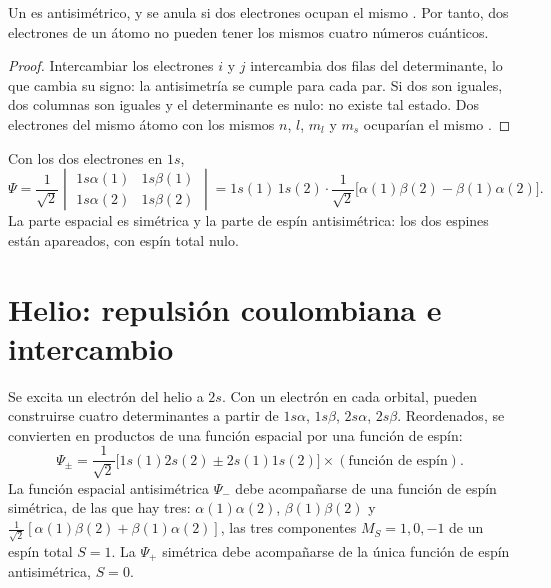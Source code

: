 \begin{theorem}\label{thm:b3:many-electron-atoms:pauli}
Un  es antisimétrico, y se anula si dos electrones
ocupan el mismo . Por tanto, dos electrones de un átomo no pueden tener los
mismos cuatro números cuánticos.
\end{theorem}

\begin{proof}
Intercambiar los electrones $i$ y $j$ intercambia dos filas del determinante,
lo que cambia su signo: la antisimetría se cumple para cada par. Si dos
 son iguales, dos columnas son iguales y el determinante es nulo:
no existe tal estado. Dos electrones del mismo átomo con los mismos $n$, $l$,
$m_l$ y $m_s$ ocuparían el mismo .
\end{proof}

\begin{example}\label{ex:b3:many-electron-atoms:helium-ground}
Con los dos electrones en $1s$,
\[
\Psi = \frac{1}{\sqrt2}\begin{vmatrix}1s\alpha(1) & 1s\beta(1)\\ 1s\alpha(2) &
1s\beta(2)\end{vmatrix} = 1s(1)\,1s(2)\cdot\frac{1}{\sqrt2}\big[\alpha(1)\beta(2)
- \beta(1)\alpha(2)\big].
\]
La parte espacial es simétrica y la parte de espín antisimétrica: los dos espines
están apareados, con espín total nulo.
\end{example}

\section{Helio: repulsión coulombiana e intercambio}

Se excita un electrón del helio a $2s$. Con un electrón en cada orbital, pueden construirse cuatro
determinantes a partir de $1s\alpha$, $1s\beta$, $2s\alpha$, $2s\beta$.
Reordenados, se convierten en productos de una función espacial por una función de espín:
\[
\Psi_\pm = \frac{1}{\sqrt2}\big[1s(1)2s(2) \pm 2s(1)1s(2)\big]\times(\text{función
de espín}).
\]
La función espacial antisimétrica $\Psi_-$ debe acompañarse de una función de espín
simétrica, de las que hay tres: $\alpha(1)\alpha(2)$,
$\beta(1)\beta(2)$ y $\frac{1}{\sqrt2}[\alpha(1)\beta(2) + \beta(1)\alpha(2)]$, las
tres componentes $M_S = 1, 0, -1$ de un espín total $S = 1$. La $\Psi_+$
simétrica debe acompañarse de la única función de espín antisimétrica, $S = 0$.

